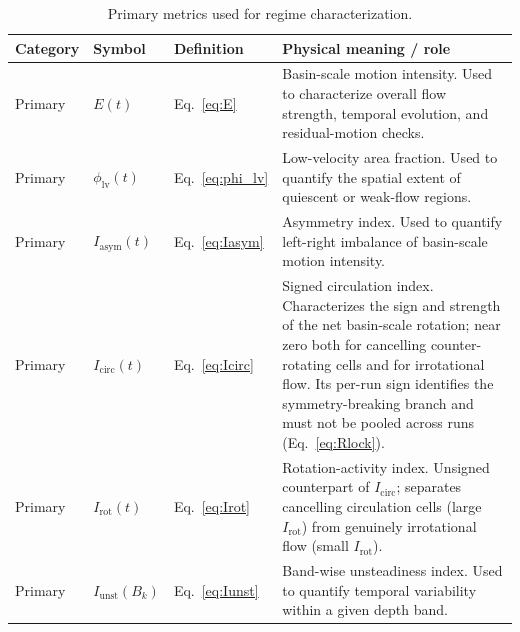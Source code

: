 \begin{table}[tb]
\centering
\caption{Primary metrics used for regime characterization.}
\label{tab:metrics_primary}
\footnotesize
\setlength{\tabcolsep}{4pt}
\begin{tabular}{p{1.7cm}p{1.8cm}p{2.4cm}p{6.0cm}}
\hline
Category & Symbol & Definition & Physical meaning / role \\
\hline
Primary &
$E(t)$ &
Eq.~\eqref{eq:E} &
Basin-scale motion intensity. Used to characterize overall flow strength, temporal evolution, and residual-motion checks. \\

Primary &
$\phi_{\mathrm{lv}}(t)$ &
Eq.~\eqref{eq:phi_lv} &
Low-velocity area fraction. Used to quantify the spatial extent of quiescent or weak-flow regions. \\

Primary &
$I_{\mathrm{asym}}(t)$ &
Eq.~\eqref{eq:Iasym} &
Asymmetry index. Used to quantify left-right imbalance of basin-scale motion intensity. \\

Primary &
$I_{\mathrm{circ}}(t)$ &
Eq.~\eqref{eq:Icirc} &
Signed circulation index. Characterizes the sign and strength of the net basin-scale rotation; near zero both for cancelling counter-rotating cells and for irrotational flow. Its per-run sign identifies the symmetry-breaking branch and must not be pooled across runs (Eq.~\eqref{eq:Rlock}). \\

Primary &
$I_{\mathrm{rot}}(t)$ &
Eq.~\eqref{eq:Irot} &
Rotation-activity index. Unsigned counterpart of $I_{\mathrm{circ}}$; separates cancelling circulation cells (large $I_{\mathrm{rot}}$) from genuinely irrotational flow (small $I_{\mathrm{rot}}$). \\

Primary &
$I_{\mathrm{unst}}(B_k)$ &
Eq.~\eqref{eq:Iunst} &
Band-wise unsteadiness index. Used to quantify temporal variability within a given depth band. \\

\hline
\end{tabular}
\end{table}
